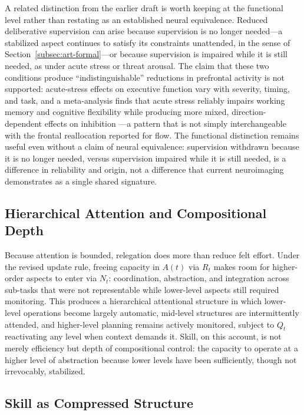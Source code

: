 \documentclass[12pt, a4paper]{article}
\theoremstyle{plain}
\theoremstyle{definition}
\theoremstyle{remark}
\begin{document}
A related distinction from the earlier draft is worth keeping at the functional level rather than restating as an established neural equivalence. Reduced deliberative supervision can arise because supervision is no longer needed---a stabilized aspect continues to satisfy its constraints unattended, in the sense of Section~\ref{subsec:art-formal}---or because supervision is impaired while it is still needed, as under acute stress or threat arousal. The claim that these two conditions produce ``indistinguishable'' reductions in prefrontal activity is not supported: acute-stress effects on executive function vary with severity, timing, and task, and a meta-analysis finds that acute stress reliably impairs working memory and cognitive flexibility while producing more mixed, direction-dependent effects on inhibition \cite{shields2016}---a pattern that is not simply interchangeable with the frontal reallocation reported for flow. The functional distinction remains useful even without a claim of neural equivalence: supervision withdrawn because it is no longer needed, versus supervision impaired while it is still needed, is a difference in reliability and origin, not a difference that current neuroimaging demonstrates as a single shared signature.

\subsection{Hierarchical Attention and Compositional Depth}

Because attention is bounded, relegation does more than reduce felt effort. Under the revised update rule, freeing capacity in $A(t)$ via $R_t$ makes room for higher-order aspects to enter via $N_t$: coordination, abstraction, and integration across sub-tasks that were not representable while lower-level aspects still required monitoring. This produces a hierarchical attentional structure in which lower-level operations become largely automatic, mid-level structures are intermittently attended, and higher-level planning remains actively monitored, subject to $Q_t$ reactivating any level when context demands it. Skill, on this account, is not merely efficiency but depth of compositional control: the capacity to operate at a higher level of abstraction because lower levels have been sufficiently, though not irrevocably, stabilized.

\subsection{Skill as Compressed Structure}
\end{document}
